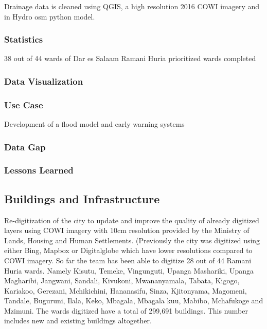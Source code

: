 \documentclass[a4paper,12pt,twoside]{article}
\begin{document}
Drainage data is cleaned using QGIS, a high resolution 2016 COWI imagery and in Hydro osm python model.

\subsubsection{Statistics}
38 out of 44 wards of Dar es Salaam Ramani Huria prioritized wards completed

\subsubsection{Data Visualization}

\subsubsection{Use Case}
Development of a flood model and early warning systems

\subsubsection{Data Gap}

\subsubsection{Lessons Learned}

\newpage
\subsection{Buildings and Infrastructure}
\begin{multicols}{2}
Re-digitization of the city to update and improve the quality of already digitized layers using COWI imagery with 10cm resolution provided by the Ministry of Lands, Housing and Human Settlements. (Previously the city was digitized using either Bing, Mapbox or Digitalglobe which have lower resolutions compared to COWI imagery. So far the team has been able to digitize 28 out of 44 Ramani Huria wards. Namely Kisutu, Temeke, Vingunguti, Upanga Mashariki, Upanga Magharibi, Jangwani, Sandali, Kivukoni, Mwananyamala, Tabata, Kigogo, Kariakoo, Gerezani, Mchikichini, Hananasifu, Sinza, Kjitonyama, Magomeni, Tandale, Buguruni, Ilala, Keko, Mbagala, Mbagala kuu, Mabibo, Mchafukoge and Mzimuni. The wards digitized have a total of 299,691 buildings. This number includes new and existing buildings altogether.
\end{multicols}
\end{document}
